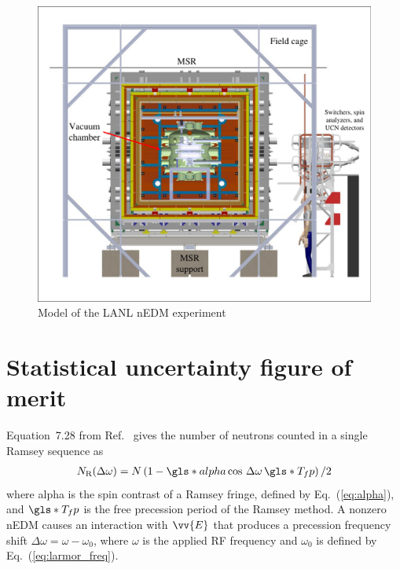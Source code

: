 \begin{figure}
    \centering
    \includegraphics[width=0.7 \textwidth]{figures/envisioned_lanl_nedm.pdf}
    \caption{Model of the LANL nEDM experiment}
    \label{fig:envisioned_lanl_nedm}
\end{figure}


\section{Statistical uncertainty figure of merit}\label{sec:figure_of_merit}


Equation~7.28 from Ref.~\cite{golubUCN} gives the number of neutrons counted in a single Ramsey sequence as
%
\begin{gather}
    N_\text{R}(\Delta \omega) = N \left( 1 - \gls*{alpha} \cos \,\Delta \omega \, \gls*{T_fp} \right)/2
\end{gather}
%
where \gls*{alpha} is the spin contrast of a Ramsey fringe, defined by Eq.~(\ref{eq:alpha}), and $\gls*{T_fp}$ is the free precession period of the Ramsey method. A nonzero nEDM causes an interaction with $\vv{E}$ that produces a precession frequency shift $\Delta\omega=\omega-\omega_0$, where $\omega$ is the applied RF frequency and $\omega_0$ is defined by Eq.~(\ref{eq:larmor_freq}). 

